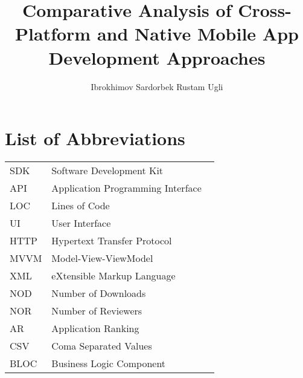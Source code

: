 \documentclass[11pt,jaso]{pnumasterh}
\title{Comparative Analysis of Cross-Platform and Native Mobile App Development Approaches}
\author{Ibrokhimov Sardorbek Rustam Ugli}
\begin{document}
\maketitle 
\pagestyle{empty}

\newpage
\pagestyle{plain} 

\setlength\cftsecnumwidth{2.3em}

\tableofcontents
\newpage
\listoffigures 
\newpage
\listoftables 
\newpage
\section*{ \Huge List of Abbreviations}
\vskip 1.5cm


\begin{tabular}{@{}p{0.2\linewidth} p{0.8\linewidth}}
    SDK & Software Development Kit \\
    API & Application Programming Interface \\
    LOC & Lines of Code \\
    UI & User Interface  \\
    HTTP & Hypertext Transfer Protocol  \\
    MVVM & Model-View-ViewModel  \\
    XML & eXtensible Markup Language \\
    NOD & Number of Downloads \\
    NOR & Number of Reviewers \\
    AR & Application Ranking \\
    CSV & Coma Separated Values \\
    BLOC & Business Logic Component
\end{tabular}
\end{document}
